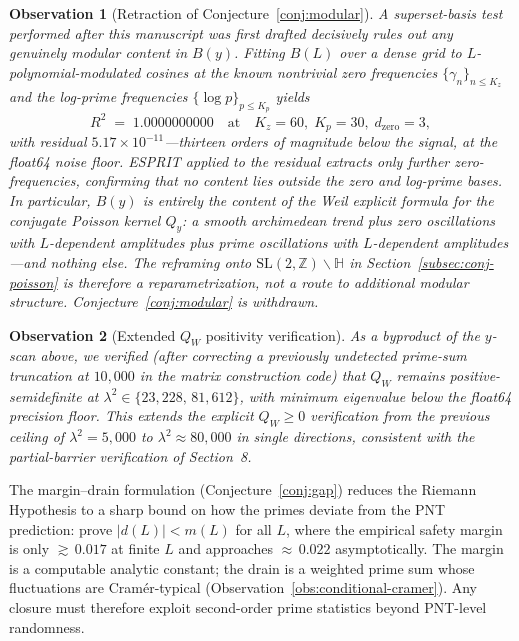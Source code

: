 \documentclass[11pt,a4paper]{article}
\newtheorem{observation}{Observation}[section]
\begin{document}
\begin{observation}[Retraction of Conjecture~\ref{conj:modular}]\label{rem:conj-modular-retraction}
A superset-basis test performed after this manuscript was first drafted decisively rules out any genuinely modular content in $B(y)$. Fitting $B(L)$ over a dense grid to $L$-polynomial-modulated cosines at the known nontrivial zero frequencies $\{\gamma_n\}_{n \le K_z}$ and the log-prime frequencies $\{\log p\}_{p \le K_p}$ yields
\[
  R^2 \;=\; 1.0000000000 \quad \text{at} \quad K_z = 60,\; K_p = 30,\; d_{\text{zero}} = 3,
\]
with residual $5.17 \times 10^{{-}11}$---thirteen orders of magnitude below the signal, at the float64 noise floor. ESPRIT applied to the residual extracts only further zero-frequencies, confirming that no content lies outside the zero and log-prime bases. In particular, $B(y)$ is \emph{entirely} the content of the Weil explicit formula for the conjugate Poisson kernel $Q_y$: a smooth archimedean trend plus zero oscillations with $L$-dependent amplitudes plus prime oscillations with $L$-dependent amplitudes---and nothing else. The reframing onto $\mathrm{SL}(2,\mathbb{Z}) \backslash \mathbb{H}$ in Section~\ref{subsec:conj-poisson} is therefore a reparametrization, not a route to additional modular structure. Conjecture~\ref{conj:modular} is withdrawn.
\end{observation}

\begin{observation}[Extended $Q_W$ positivity verification]
As a byproduct of the $y$-scan above, we verified (after correcting a previously undetected prime-sum truncation at $10{,}000$ in the matrix construction code) that $Q_W$ remains positive-semidefinite at $\lambda^2 \in \{23{,}228,\,81{,}612\}$, with minimum eigenvalue below the float64 precision floor. This extends the explicit $Q_W \geq 0$ verification from the previous ceiling of $\lambda^2 = 5{,}000$ to $\lambda^2 \approx 80{,}000$ in single directions, consistent with the partial-barrier verification of Section~8.
\end{observation}

\noindent The margin--drain formulation (Conjecture~\ref{conj:gap}) reduces the Riemann Hypothesis to a sharp bound on how the primes deviate from the PNT prediction: prove $|d(L)| < m(L)$ for all $L$, where the empirical safety margin is only ${\gtrsim}\,0.017$ at finite $L$ and approaches ${\approx}\,0.022$ asymptotically. The margin is a computable analytic constant; the drain is a weighted prime sum whose fluctuations are Cram\'er-typical (Observation~\ref{obs:conditional-cramer}). Any closure must therefore exploit second-order prime statistics beyond PNT-level randomness.
\end{document}
